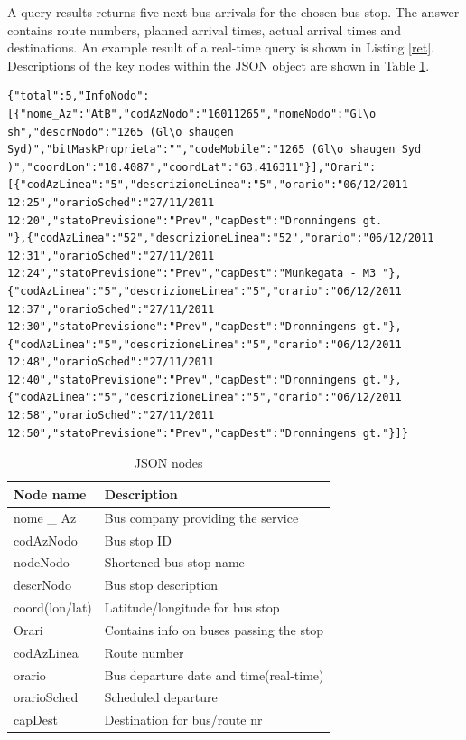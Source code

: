 A query results returns five next bus arrivals for the chosen bus stop. The answer contains route numbers, planned arrival times, actual arrival times and destinations. An example result of a real-time query is shown in Listing \ref{ret}. Descriptions of the key nodes within the JSON object are shown in Table \ref{tab:real-time}.

\medskip
\begin{lstlisting}[caption={Real-time query result}, label=ret]
 {"total":5,"InfoNodo":[{"nome_Az":"AtB","codAzNodo":"16011265","nomeNodo":"Gl\o sh","descrNodo":"1265 (Gl\o shaugen Syd)","bitMaskProprieta":"","codeMobile":"1265 (Gl\o shaugen Syd )","coordLon":"10.4087","coordLat":"63.416311"}],"Orari":[{"codAzLinea":"5","descrizioneLinea":"5","orario":"06/12/2011 12:25","orarioSched":"27/11/2011 12:20","statoPrevisione":"Prev","capDest":"Dronningens gt.                "},{"codAzLinea":"52","descrizioneLinea":"52","orario":"06/12/2011 12:31","orarioSched":"27/11/2011 12:24","statoPrevisione":"Prev","capDest":"Munkegata - M3 "},{"codAzLinea":"5","descrizioneLinea":"5","orario":"06/12/2011 12:37","orarioSched":"27/11/2011 12:30","statoPrevisione":"Prev","capDest":"Dronningens gt."},{"codAzLinea":"5","descrizioneLinea":"5","orario":"06/12/2011 12:48","orarioSched":"27/11/2011 12:40","statoPrevisione":"Prev","capDest":"Dronningens gt."},{"codAzLinea":"5","descrizioneLinea":"5","orario":"06/12/2011 12:58","orarioSched":"27/11/2011 12:50","statoPrevisione":"Prev","capDest":"Dronningens gt."}]}
\end{lstlisting}

\begin{table}[h!]
\caption{JSON nodes}
\label{tab:real-time}
\centering
\begin{tabular}{| p{} | p{} |}
\hline
 \textbf{Node name} &   \textbf{Description} \\
\hline
nome \_ Az & Bus company providing the service \\
\hline
codAzNodo &  Bus stop ID\\
\hline
nodeNodo &  Shortened bus stop name\\
\hline
descrNodo &  Bus stop description\\
\hline
coord(lon/lat) &  Latitude/longitude for bus stop\\
\hline
\hline
Orari &  Contains info on buses passing the stop\\
\hline
codAzLinea &  Route number\\
\hline
orario &  Bus departure date and time(real-time)\\
\hline
orarioSched &  Scheduled departure\\
\hline
capDest &  Destination for bus/route nr\\
\hline
\end{tabular}
\end{table}

